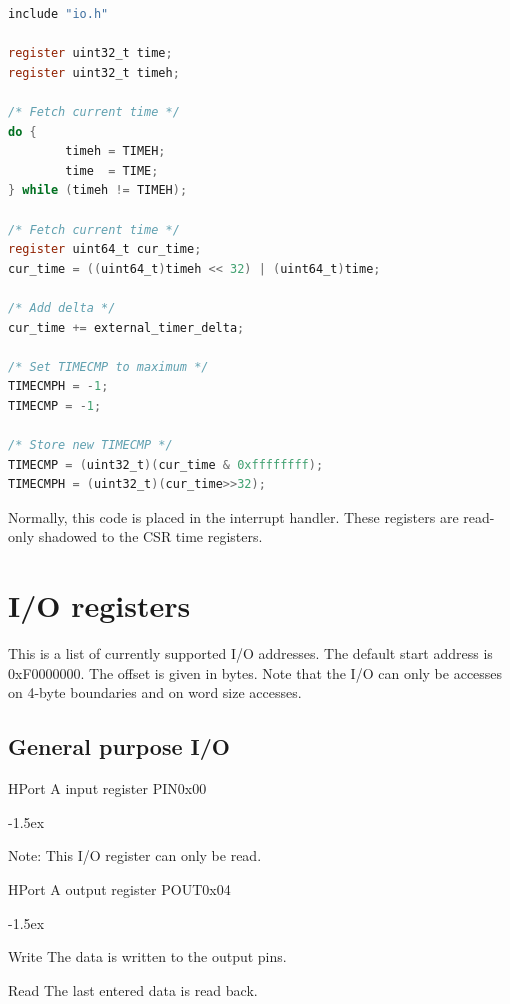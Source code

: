 \documentclass[12pt]{article}
\begin{document}
\begin{lstlisting}[language=C]
include "io.h"

register uint32_t time;
register uint32_t timeh;

/* Fetch current time */
do {
        timeh = TIMEH;
        time  = TIME;
} while (timeh != TIMEH);

/* Fetch current time */
register uint64_t cur_time;
cur_time = ((uint64_t)timeh << 32) | (uint64_t)time;

/* Add delta */
cur_time += external_timer_delta;

/* Set TIMECMP to maximum */
TIMECMPH = -1;
TIMECMP = -1;

/* Store new TIMECMP */
TIMECMP = (uint32_t)(cur_time & 0xffffffff);
TIMECMPH = (uint32_t)(cur_time>>32);
\end{lstlisting}

Normally, this code is placed in the interrupt handler. These registers are read-only shadowed to the CSR time registers.

\section{I/O registers}
\label{sec:ioregisters}
This is a list of currently supported I/O addresses. 
The default start address is 0xF0000000. The offset is given in bytes. Note that the I/O can only be accesses on 4-byte boundaries and on word size accesses.

\subsection{General purpose I/O}

\begin{register}{H}{Port A input register PIN}{0x00}%
\label{pinx}%
\regnewline%
\end{register}
\begin{regdesc}[0.6\textwidth]\begin{reglist}[000000000]
\itemsep-1.5ex
\item[Note:] This I/O register can only be read.
\end{reglist}\end{regdesc}

\begin{register}{H}{Port A output register POUT}{0x04}%
\label{poutx}%
\regnewline%
\end{register}
\begin{regdesc}[0.6\textwidth]\begin{reglist}[000000000]
\itemsep-1.5ex
\item[Write] The data is written to the output pins.
\item[Read] The last entered data is read back.
\end{reglist}\end{regdesc}
\end{document}

